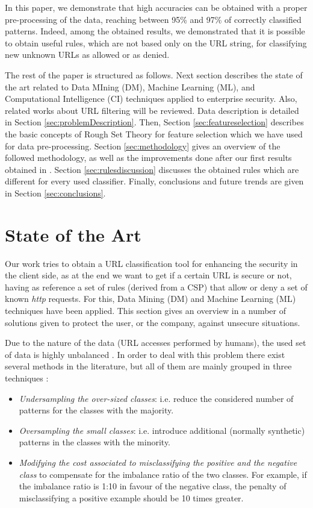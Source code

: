 \documentclass{llncs}
\begin{document}
In this paper, we demonstrate that high accuracies can be obtained with a proper pre-processing of the data, reaching between 95\% and 97\% of correctly classified patterns. Indeed, among the obtained results, we demonstrated that it is possible to obtain useful rules, which are not based only on the URL string, for classifying new unknown URLs as allowed or as denied.

The rest of the paper is structured as follows. Next section describes the state of the art related to Data MIning (DM), Machine Learning (ML), and Computational Intelligence (CI) techniques applied to enterprise security. Also, related works about URL filtering will be reviewed. Data description is detailed in Section \ref{sec:problemDescription}. Then, Section \ref{sec:featureselection} describes the basic concepts of Rough Set Theory for feature selection which we have used for data pre-processing. Section \ref{sec:methodology} gives an overview of the followed methodology, as well as the improvements done after our first results obtained in \cite{ECTA}. Section \ref{sec:rulesdiscussion} discusses the obtained rules which are different for every used classifier. Finally, conclusions and future trends are given in Section \ref{sec:conclusions}. 

%
\section{State of the Art}
\label{sec:stateofart}

\noindent Our work tries to obtain a URL classification tool for enhancing the security in the client side, as at the end we want to get if a certain URL is secure or not, having as reference a set of rules (derived from a CSP) that allow or deny a set of known \textit{http} requests. For this, Data Mining (DM) and Machine Learning (ML) techniques have been applied. This section gives an overview in a number of solutions given to protect the user, or the company, against unsecure situations.

Due to the nature of the data (URL accesses performed by humans), the used set of data is highly unbalanced \cite{imbalanced_data_05}. In order to deal with this problem there exist several methods in the
literature, but all of them are mainly grouped in three techniques
\cite{imbalance_techniques_02}: 

\begin{itemize}
\item \textit{Undersampling the over-sized classes}: i.e. reduce the considered number of patterns for the classes with the majority.
\item \textit{Oversampling the small classes}: i.e. introduce additional (normally synthetic) patterns in the classes with the minority.
\item \textit{Modifying the cost associated to misclassifying the positive and the negative class} to compensate for the imbalance ratio of the two classes. For example, if the imbalance ratio is 1:10 in favour of the negative class, the penalty of misclassifying a positive example should be 10 times greater.
\end{itemize}
\end{document}
